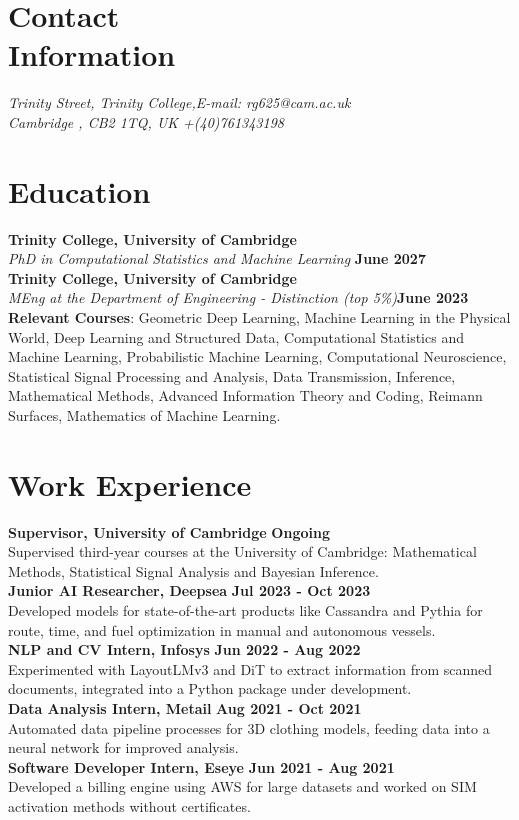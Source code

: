 \documentclass{res}
\begin{document}
\vspace*{-2.6cm}

\begin{resume}

\section{Contact\\Information}
{\sl Trinity Street, Trinity College,\hfill E-mail: rg625@cam.ac.uk \\ Cambridge , CB2 1TQ, UK  \hfill+(40)761343198}
\section{Education}
\textbf{Trinity College, University of Cambridge} \\
{\sl PhD in Computational Statistics and Machine Learning} \hfill \textbf{June 2027}\\
\textbf{\bf Trinity College, University of Cambridge} \\
{\sl MEng at the Department of Engineering - Distinction (top 5\%)}\hfill \textbf{June 2023}\\
\textbf{Relevant Courses}:
Geometric Deep Learning, Machine Learning in the Physical World, Deep Learning and Structured Data,
Computational Statistics and Machine Learning,
Probabilistic Machine Learning,
Computational Neuroscience,
Statistical Signal Processing and Analysis,
Data Transmission, Inference,
Mathematical Methods,
Advanced Information Theory and Coding, Reimann Surfaces, Mathematics of Machine Learning.

\section{Work Experience}
\textbf{Supervisor, University of Cambridge} \hfill \textbf{Ongoing} \\
Supervised third-year courses at the University of Cambridge: Mathematical Methods, Statistical Signal Analysis and Bayesian Inference. \\
\textbf{Junior AI Researcher, Deepsea} \hfill \textbf{Jul 2023 - Oct 2023} \\
Developed models for state-of-the-art products like Cassandra and Pythia for route, time, and fuel optimization in manual and autonomous vessels.\\
\textbf{NLP and CV Intern, Infosys} \hfill \textbf{Jun 2022 - Aug 2022} \\
Experimented with LayoutLMv3 and DiT to extract information from scanned documents, integrated into a Python package under development.\\
\textbf{Data Analysis Intern, Metail} \hfill \textbf{Aug 2021 - Oct 2021} \\
Automated data pipeline processes for 3D clothing models, feeding data into a neural network for improved analysis.\\
\textbf{Software Developer Intern, Eseye} \hfill \textbf{Jun 2021 - Aug 2021} \\
Developed a billing engine using AWS for large datasets and worked on SIM activation methods without certificates.\\


\end{resume}
\end{document}
